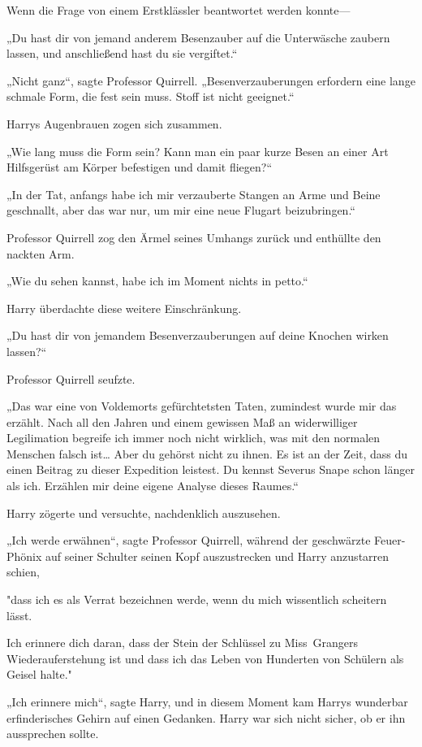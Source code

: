 {Wenn die Frage von einem Erstklässler beantwortet werden konnte—

„Du hast dir von jemand anderem Besenzauber auf die Unterwäsche zaubern lassen, und anschließend hast du sie vergiftet.“

„Nicht ganz“, sagte Professor Quirrell. „Besenverzauberungen erfordern eine lange schmale Form, die fest sein muss. Stoff ist nicht geeignet.“

Harrys Augenbrauen zogen sich zusammen.

„Wie lang muss die Form sein? Kann man ein paar kurze Besen an einer Art Hilfsgerüst am Körper befestigen und damit fliegen?“

„In der Tat, anfangs habe ich mir verzauberte Stangen an Arme und Beine geschnallt, aber das war nur, um mir eine neue Flugart beizubringen.“

Professor Quirrell zog den Ärmel seines Umhangs zurück und enthüllte den nackten Arm.

„Wie du sehen kannst, habe ich im Moment nichts in petto.“

Harry überdachte diese weitere Einschränkung.

„Du hast dir von jemandem Besenverzauberungen auf deine Knochen wirken lassen?“

Professor Quirrell seufzte.

„Das war eine von Voldemorts gefürchtetsten Taten, zumindest wurde mir das erzählt. Nach all den Jahren und einem gewissen Maß an widerwilliger Legilimation begreife ich immer noch nicht wirklich, was mit den normalen Menschen falsch ist… Aber du gehörst nicht zu ihnen. Es ist an der Zeit, dass du einen Beitrag zu dieser Expedition leistest. Du kennst Severus Snape schon länger als ich. Erzählen mir deine eigene Analyse dieses Raumes.“

Harry zögerte und versuchte, nachdenklich auszusehen.

„Ich werde erwähnen“, sagte Professor Quirrell, während der geschwärzte Feuer-Phönix auf seiner Schulter seinen Kopf auszustrecken und Harry anzustarren schien,

"dass ich es als Verrat bezeichnen werde, wenn du mich wissentlich scheitern lässt.

Ich erinnere dich daran, dass der Stein der Schlüssel zu Miss~Grangers Wiederauferstehung ist und dass ich das Leben von Hunderten von Schülern als Geisel halte."

„Ich erinnere mich“, sagte Harry, und in diesem Moment kam Harrys wunderbar erfinderisches Gehirn auf einen Gedanken. Harry war sich nicht sicher, ob er ihn aussprechen sollte.

}
